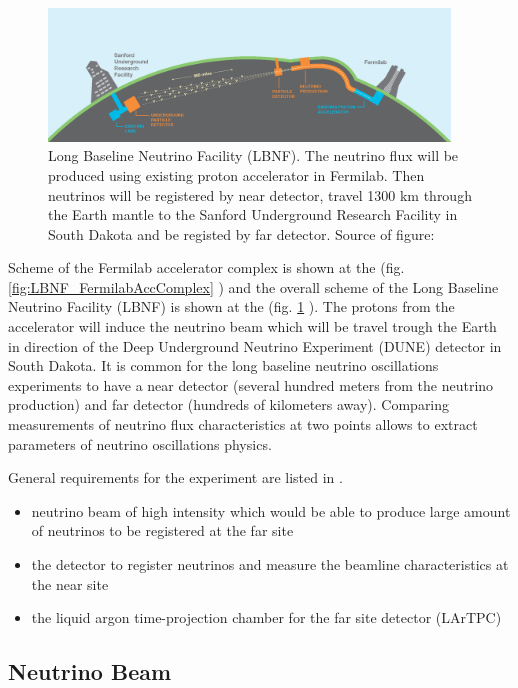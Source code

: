 \begin{figure}
\caption{Long Baseline Neutrino Facility (LBNF). The neutrino flux will be produced using existing proton accelerator in Fermilab. Then neutrinos will be registered by near detector, travel 1300 km through the Earth mantle to the Sanford Underground Research Facility in South Dakota and be registed by far detector. Source of figure: \cite{ref_LBNFweb} }
\label{fig:LBNF_overallScheme}
\centering
\includegraphics[width=0.95\textwidth, keepaspectratio=true]{figs/LBNF_overallScheme.png} 
\end{figure}

Scheme of the Fermilab accelerator complex is shown at the (fig. \ref{fig:LBNF_FermilabAccComplex} ) and the overall scheme of the 
Long Baseline Neutrino Facility (LBNF) is shown at the (fig. \ref{fig:LBNF_overallScheme} ). The protons from the accelerator  will induce the neutrino beam which will be travel trough the Earth in direction of the Deep Underground Neutrino Experiment (DUNE) detector in South Dakota. It is common for the long baseline neutrino oscillations experiments to have a near detector (several hundred meters from the neutrino production) and far detector (hundreds of kilometers away). Comparing measurements of neutrino flux characteristics at two points allows to extract parameters of neutrino oscillations physics.

General requirements for the experiment are listed in \cite{ref_LBNFdoc_volume-detectors}.
\begin{itemize}
  \item neutrino beam of high intensity which would be able to produce large amount of neutrinos to be registered at the far site
  \item the detector to register neutrinos and measure the beamline characteristics at the near site
  \item the liquid argon time-projection chamber for the far site detector (LArTPC)
\end{itemize}

\subsection{Neutrino Beam}

